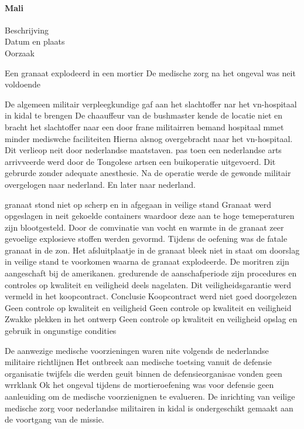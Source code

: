  


\paragraph{Mali}

\begin{description}
\item[Beschrijving]
\item[Datum en plaats] 
\item[Oorzaak]
\end{description}
Een granaat explodeerd in een mortier
De medische zorg na het ongeval was neit voldoende


De algemeen militair verpleegkundige gaf aan het slachtoffer nar het vn-hospitaal in kidal te brengen
De chaauffeur van de bushmaster kende de locatie niet  en bracht het slachtoffer naar een door frane militairren bemand hospitaal mmet minder mediswche faciliteiten
Hierna alsnog overgebracht naar het vn-hospitaal.
Dit verlieop  neit door nederlandse maatstaven.
pas toen een nederlandse arts arrivveerde werd door de Tongolese artsen een buikoperatie uitgevoerd.
Dit gebrurde zonder adequate anesthesie.
Na de operatie werde de gewonde militair overgelogen naar nederland. En later naar nederland.


granaat stond niet op scherp en in afgegaan in veilige stand
Granaat werd opgeslagen in neit gekoelde containers waardoor deze aan te hoge temeperaturen zijn blootgesteld.
Door de comvinatie van vocht en warmte in de granaat zeer gevoelige explosieve stoffen werden gevormd.
Tijdens de oefening was de fatale granaat in de zon.
Het afsluitplaatje in de granaat bleek niet in staat om doorslag in veilige stand te voorkomen waarna de granaat explodeerde.
De moritren zijn aangeschaft bij de amerikanen. gredurende de aanschafperiode zijn procedures en controles op kwaliteit en veiligheid deels nagelaten.
Dit veiligheidsgarantie werd vermeld in het koopcontract.
Conclusie
Koopcontract werd niet goed doorgelezen
Geen controle op kwaliteit en veiligheid
Geen controle op kwaliteit en veiligheid
Zwakke plekken in het ontwerp
Geen controle op kwaliteit en veiligheid
opslag en gebruik in ongunstige condities

De aanwezige medische voorzieningen waren nite volgends de nederlandse militaire richtlijnen
Het ontbreek aan medische toetsing vanuit de defensie organisatie
twijfels die werden geuit binnen de defensieorganisae vonden geen wrrklank
Ok het ongeval tijdens de mortieroefening was voor defensie geen aanleuiding om de medische voorzienignen te evalueren.
De inrichting van veilige medische zorg voor nederlandse militairen in kidal is ondergeschikt gemaakt aan de voortgang van de missie.


